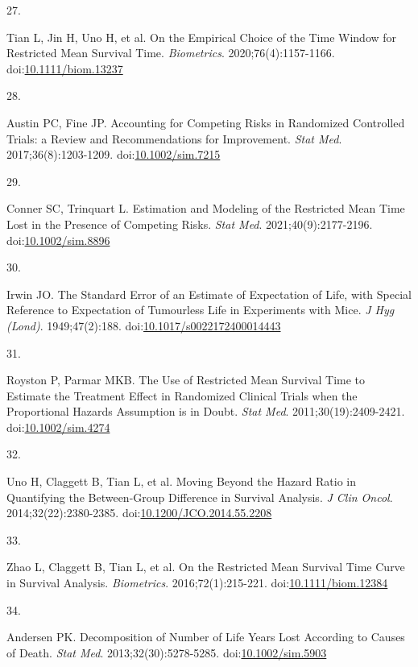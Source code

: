 \documentclass[
  12pt,
  number]{elsarticle}
\newlength{\cslhangindent}
\newlength{\csllabelwidth}
\newenvironment{CSLReferences}[2] %
 {\begin{list}{}{%
  \setlength{\itemindent}{0pt}
  \setlength{\leftmargin}{0pt}
  \setlength{\parsep}{0pt}
  \ifodd #1
   \setlength{\leftmargin}{\cslhangindent}
   \setlength{\itemindent}{-1\cslhangindent}
  \fi
  \setlength{\itemsep}{#2\baselineskip}}}
 {\end{list}}
\newcommand{\CSLLeftMargin}[1]{\parbox[t]{\csllabelwidth}{\strut#1\strut}}
\newcommand{\CSLRightInline}[1]{\parbox[t]{\linewidth - \csllabelwidth}{\strut#1\strut}}
\begin{document}
\begin{CSLReferences}{0}{1}
\CSLLeftMargin{27. }%
\CSLRightInline{Tian L, Jin H, Uno H, et al. {On the Empirical Choice of
the Time Window for Restricted Mean Survival Time}. \emph{Biometrics}.
2020;76(4):1157-1166.
doi:\href{https://doi.org/10.1111/biom.13237}{10.1111/biom.13237}}

\CSLLeftMargin{28. }%
\CSLRightInline{Austin PC, Fine JP. {Accounting for Competing Risks in
Randomized Controlled Trials: a Review and Recommendations for
Improvement}. \emph{Stat Med}. 2017;36(8):1203-1209.
doi:\href{https://doi.org/10.1002/sim.7215}{10.1002/sim.7215}}

\CSLLeftMargin{29. }%
\CSLRightInline{Conner SC, Trinquart L. {Estimation and Modeling of the
Restricted Mean Time Lost in the Presence of Competing Risks}.
\emph{Stat Med}. 2021;40(9):2177-2196.
doi:\href{https://doi.org/10.1002/sim.8896}{10.1002/sim.8896}}

\CSLLeftMargin{30. }%
\CSLRightInline{Irwin JO. {The Standard Error of an Estimate of
Expectation of Life, with Special Reference to Expectation of Tumourless
Life in Experiments with Mice}. \emph{{J Hyg (Lond)}}. 1949;47(2):188.
doi:\href{https://doi.org/10.1017/s0022172400014443}{10.1017/s0022172400014443}}

\CSLLeftMargin{31. }%
\CSLRightInline{Royston P, Parmar MKB. {The Use of Restricted Mean
Survival Time to Estimate the Treatment Effect in Randomized Clinical
Trials when the Proportional Hazards Assumption is in Doubt}. \emph{Stat
Med}. 2011;30(19):2409-2421.
doi:\href{https://doi.org/10.1002/sim.4274}{10.1002/sim.4274}}

\CSLLeftMargin{32. }%
\CSLRightInline{Uno H, Claggett B, Tian L, et al. {Moving Beyond the
Hazard Ratio in Quantifying the Between-Group Difference in Survival
Analysis}. \emph{J Clin Oncol}. 2014;32(22):2380-2385.
doi:\href{https://doi.org/10.1200/JCO.2014.55.2208}{10.1200/JCO.2014.55.2208}}

\CSLLeftMargin{33. }%
\CSLRightInline{Zhao L, Claggett B, Tian L, et al. {On the Restricted
Mean Survival Time Curve in Survival Analysis}. \emph{Biometrics}.
2016;72(1):215-221.
doi:\href{https://doi.org/10.1111/biom.12384}{10.1111/biom.12384}}

\CSLLeftMargin{34. }%
\CSLRightInline{Andersen PK. {Decomposition of Number of Life Years Lost
According to Causes of Death}. \emph{Stat Med}. 2013;32(30):5278-5285.
doi:\href{https://doi.org/10.1002/sim.5903}{10.1002/sim.5903}}


\end{CSLReferences}
\end{document}
